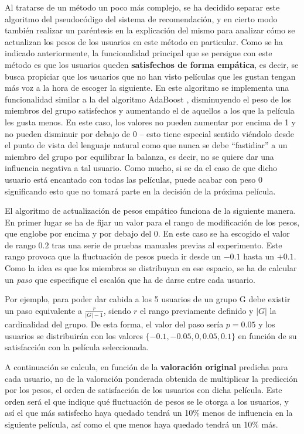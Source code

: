Al tratarse de un método un poco más complejo, se ha decidido separar este algoritmo del pseudocódigo del sistema de recomendación, y en cierto modo también realizar un paréntesis en la explicación del mismo para analizar cómo se actualizan los pesos de los usuarios en este método en particular. Como se ha indicado anteriormente, la funcionalidad principal que se persigue con este método es que los usuarios queden \textbf{satisfechos de forma empática}, es decir, se busca propiciar que los usuarios que no han visto películas que les gustan tengan más voz a la hora de escoger la siguiente. En este algoritmo se implementa una funcionalidad similar a la del algoritmo AdaBoost \cite{adaboost}, disminuyendo el peso de los miembros del grupo satisfechos y aumentando el de aquellos a los que la película les gusta menos. En este caso, los valores no pueden aumentar por encima de 1 y no pueden disminuir por debajo de 0 -- esto tiene especial sentido viéndolo desde el punto de vista del lenguaje natural como que nunca se debe ``fastidiar'' a un miembro del grupo por equilibrar la balanza, es decir, no se quiere dar una influencia negativa a tal usuario. Como mucho, si se da el caso de que dicho usuario está encantado con todas las películas, puede acabar con peso 0 significando esto que no tomará parte en la decisión de la próxima película.

El algoritmo de actualización de pesos empático funciona de la siguiente manera. En primer lugar se ha de fijar un valor para el rango de modificación de los pesos, que englobe por encima y por debajo del 0. En este caso se ha escogido el valor de rango $0.2$ tras una serie de pruebas manuales previas al experimento. Este rango provoca que la fluctuación de pesos pueda ir desde un $-0.1$ hasta un $+0.1$. Como la idea es que los miembros se distribuyan en ese espacio, se ha de calcular un \textit{paso} que especifique el escalón que ha de darse entre cada usuario.

Por ejemplo, para poder dar cabida a los 5 usuarios de un grupo G debe existir un paso equivalente a $\frac{r}{|G|-1}$, siendo $r$ el rango previamente definido y $|G|$ la cardinalidad del grupo. De esta forma, el valor del paso sería $p = 0.05$ y los usuarios se distribuirán con los valores $\{-0.1, -0.05, 0, 0.05, 0.1\}$ en función de su satisfacción con la película seleccionada.

A continuación se calcula, en función de la \textbf{valoración original} predicha para cada usuario, no de la valoración ponderada obtenida de multiplicar la predicción por los pesos, el orden de satisfacción de los usuarios con dicha película. Este orden será el que indique qué fluctuación de pesos se le otorga a los usuarios, y así el que más satisfecho haya quedado tendrá un 10\% menos de influencia en la siguiente película, así como el que menos haya quedado tendrá un 10\% más.

